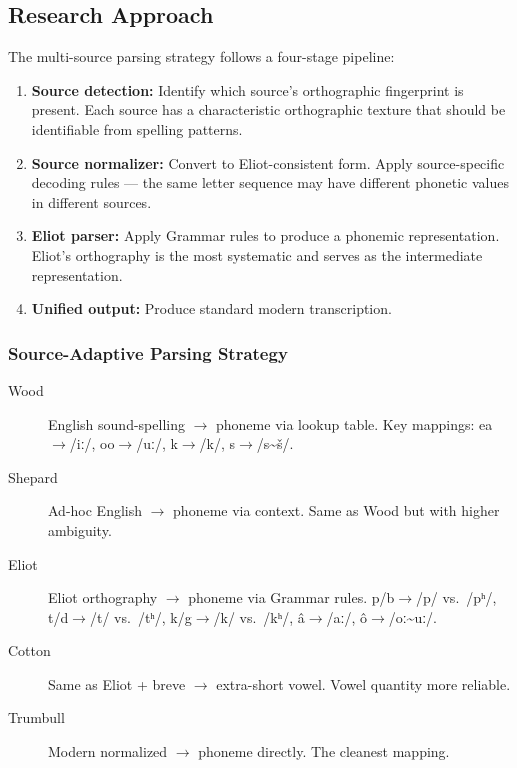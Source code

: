 \subsection{Research Approach}

The multi-source parsing strategy follows a four-stage pipeline:

\begin{enumerate}
  \item \textbf{Source detection:} Identify which source's orthographic
    fingerprint is present. Each source has a characteristic orthographic
    texture that should be identifiable from spelling patterns.
  \item \textbf{Source normalizer:} Convert to Eliot-consistent form. Apply
    source-specific decoding rules --- the same letter sequence may have
    different phonetic values in different sources.
  \item \textbf{Eliot parser:} Apply Grammar rules to produce a phonemic
    representation. Eliot's orthography is the most systematic and serves as
    the intermediate representation.
  \item \textbf{Unified output:} Produce standard modern transcription.
\end{enumerate}

\subsubsection{Source-Adaptive Parsing Strategy}

\begin{description}
  \item[Wood] English sound-spelling $\rightarrow$ phoneme via lookup table.
    Key mappings: ea$\rightarrow$/iː/, oo$\rightarrow$/uː/, k$\rightarrow$/k/,
    s$\rightarrow$/s\textasciitilde š/.
  \item[Shepard] Ad-hoc English $\rightarrow$ phoneme via context. Same as Wood
    but with higher ambiguity.
  \item[Eliot] Eliot orthography $\rightarrow$ phoneme via Grammar rules.
    p/b$\rightarrow$/p/ vs.\ /pʰ/, t/d$\rightarrow$/t/ vs.\ /tʰ/,
    k/g$\rightarrow$/k/ vs.\ /kʰ/, â$\rightarrow$/aː/, ô$\rightarrow$/oː\textasciitilde uː/.
  \item[Cotton] Same as Eliot + breve $\rightarrow$ extra-short vowel. Vowel
    quantity more reliable.
  \item[Trumbull] Modern normalized $\rightarrow$ phoneme directly. The cleanest
    mapping.
\end{description}


